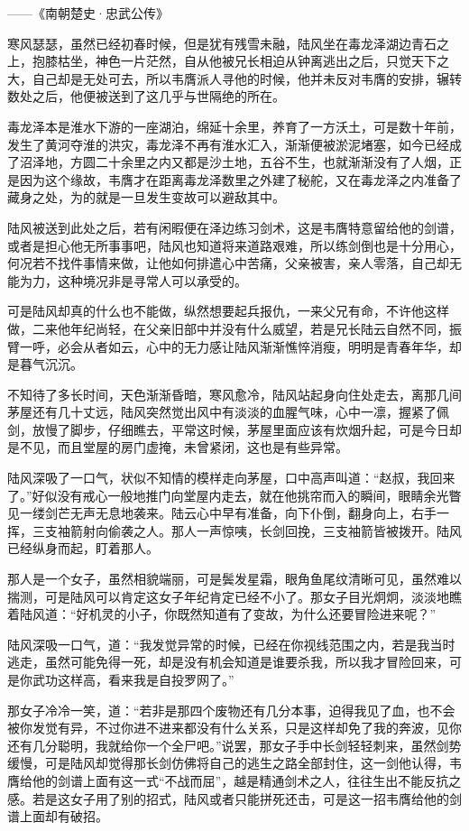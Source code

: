 ——《南朝楚史·忠武公传》

寒风瑟瑟，虽然已经初春时候，但是犹有残雪未融，陆风坐在毒龙泽湖边青石之上，抱膝枯坐，神色一片茫然，自从他被兄长相迫从钟离逃出之后，只觉天下之大，自己却是无处可去，所以韦膺派人寻他的时候，他并未反对韦膺的安排，辗转数处之后，他便被送到了这几乎与世隔绝的所在。

毒龙泽本是淮水下游的一座湖泊，绵延十余里，养育了一方沃土，可是数十年前，发生了黄河夺淮的洪灾，毒龙泽不再有淮水汇入，渐渐便被淤泥堵塞，如今已经成了沼泽地，方圆二十余里之内又都是沙土地，五谷不生，也就渐渐没有了人烟，正是因为这个缘故，韦膺才在距离毒龙泽数里之外建了秘舵，又在毒龙泽之内准备了藏身之处，为的就是一旦发生变故可以避敌其中。

陆风被送到此处之后，若有闲暇便在泽边练习剑术，这是韦膺特意留给他的剑谱，或者是担心他无所事事吧，陆风也知道将来道路艰难，所以练剑倒也是十分用心，何况若不找件事情来做，让他如何排遣心中苦痛，父亲被害，亲人零落，自己却无能为力，这种境况非是寻常人可以承受的。

可是陆风却真的什么也不能做，纵然想要起兵报仇，一来父兄有命，不许他这样做，二来他年纪尚轻，在父亲旧部中并没有什么威望，若是兄长陆云自然不同，振臂一呼，必会从者如云，心中的无力感让陆风渐渐憔悴消瘦，明明是青春年华，却是暮气沉沉。

不知待了多长时间，天色渐渐昏暗，寒风愈冷，陆风站起身向住处走去，离那几间茅屋还有几十丈远，陆风突然觉出风中有淡淡的血腥气味，心中一凛，握紧了佩剑，放慢了脚步，仔细瞧去，平常这时候，茅屋里面应该有炊烟升起，可是今日却是不见，而且堂屋的房门虚掩，未曾紧闭，这也是有些异常。

陆风深吸了一口气，状似不知情的模样走向茅屋，口中高声叫道：“赵叔，我回来了。”好似没有戒心一般地推门向堂屋内走去，就在他挑帘而入的瞬间，眼睛余光瞥见一缕剑芒无声无息地袭来。陆云心中早有准备，向下仆倒，翻身向上，右手一挥，三支袖箭射向偷袭之人。那人一声惊咦，长剑回挽，三支袖箭皆被拨开。陆风已经纵身而起，盯着那人。

那人是一个女子，虽然相貌端丽，可是鬓发星霜，眼角鱼尾纹清晰可见，虽然难以揣测，可是陆风可以肯定这女子年纪肯定已经不小了。那女子目光炯炯，淡淡地瞧着陆风道：“好机灵的小子，你既然知道有了变故，为什么还要冒险进来呢？”

陆风深吸一口气，道：“我发觉异常的时候，已经在你视线范围之内，若是我当时逃走，虽然可能免得一死，却是没有机会知道是谁要杀我，所以我才冒险回来，可是你武功这样高，看来我是自投罗网了。”

那女子冷冷一笑，道：“若非是那四个废物还有几分本事，迫得我见了血，也不会被你发觉有异，不过你进不进来都没有什么关系，只是这样却免了我的奔波，见你还有几分聪明，我就给你一个全尸吧。”说罢，那女子手中长剑轻轻刺来，虽然剑势缓慢，可是陆风却觉得那长剑仿佛将自己的逃生之路全部封住，这一剑他认得，韦膺给他的剑谱上面有这一式“不战而屈”，越是精通剑术之人，往往生出不能反抗之感。若是这女子用了别的招式，陆风或者只能拼死还击，可是这一招韦膺给他的剑谱上面却有破招。

